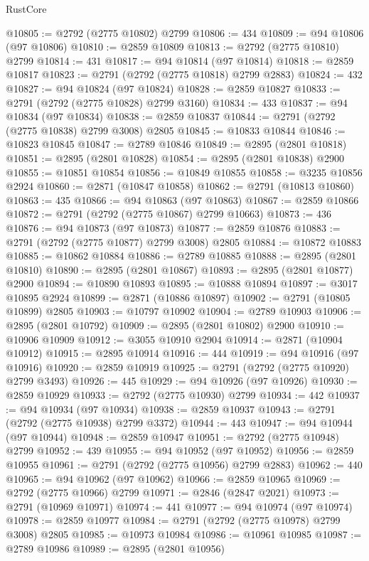 \begin{lexlean}{RustCore}
\begin{coremodule}
@10805 := @2792 (@2775 @10802) @2799
@10806 := 434
@10809 := @94 @10806 (@97 @10806)
@10810 := @2859 @10809
@10813 := @2792 (@2775 @10810) @2799
@10814 := 431
@10817 := @94 @10814 (@97 @10814)
@10818 := @2859 @10817
@10823 := @2791 (@2792 (@2775 @10818) @2799 @2883)
@10824 := 432
@10827 := @94 @10824 (@97 @10824)
@10828 := @2859 @10827
@10833 := @2791 (@2792 (@2775 @10828) @2799 @3160)
@10834 := 433
@10837 := @94 @10834 (@97 @10834)
@10838 := @2859 @10837
@10844 := @2791 (@2792 (@2775 @10838) @2799 @3008) @2805
@10845 := @10833 @10844
@10846 := @10823 @10845
@10847 := @2789 @10846
@10849 := @2895 (@2801 @10818)
@10851 := @2895 (@2801 @10828)
@10854 := @2895 (@2801 @10838) @2900
@10855 := @10851 @10854
@10856 := @10849 @10855
@10858 := @3235 @10856 @2924
@10860 := @2871 (@10847 @10858)
@10862 := @2791 (@10813 @10860)
@10863 := 435
@10866 := @94 @10863 (@97 @10863)
@10867 := @2859 @10866
@10872 := @2791 (@2792 (@2775 @10867) @2799 @10663)
@10873 := 436
@10876 := @94 @10873 (@97 @10873)
@10877 := @2859 @10876
@10883 := @2791 (@2792 (@2775 @10877) @2799 @3008) @2805
@10884 := @10872 @10883
@10885 := @10862 @10884
@10886 := @2789 @10885
@10888 := @2895 (@2801 @10810)
@10890 := @2895 (@2801 @10867)
@10893 := @2895 (@2801 @10877) @2900
@10894 := @10890 @10893
@10895 := @10888 @10894
@10897 := @3017 @10895 @2924
@10899 := @2871 (@10886 @10897)
@10902 := @2791 (@10805 @10899) @2805
@10903 := @10797 @10902
@10904 := @2789 @10903
@10906 := @2895 (@2801 @10792)
@10909 := @2895 (@2801 @10802) @2900
@10910 := @10906 @10909
@10912 := @3055 @10910 @2904
@10914 := @2871 (@10904 @10912)
@10915 := @2895 @10914
@10916 := 444
@10919 := @94 @10916 (@97 @10916)
@10920 := @2859 @10919
@10925 := @2791 (@2792 (@2775 @10920) @2799 @3493)
@10926 := 445
@10929 := @94 @10926 (@97 @10926)
@10930 := @2859 @10929
@10933 := @2792 (@2775 @10930) @2799
@10934 := 442
@10937 := @94 @10934 (@97 @10934)
@10938 := @2859 @10937
@10943 := @2791 (@2792 (@2775 @10938) @2799 @3372)
@10944 := 443
@10947 := @94 @10944 (@97 @10944)
@10948 := @2859 @10947
@10951 := @2792 (@2775 @10948) @2799
@10952 := 439
@10955 := @94 @10952 (@97 @10952)
@10956 := @2859 @10955
@10961 := @2791 (@2792 (@2775 @10956) @2799 @2883)
@10962 := 440
@10965 := @94 @10962 (@97 @10962)
@10966 := @2859 @10965
@10969 := @2792 (@2775 @10966) @2799
@10971 := @2846 (@2847 @2021)
@10973 := @2791 (@10969 @10971)
@10974 := 441
@10977 := @94 @10974 (@97 @10974)
@10978 := @2859 @10977
@10984 := @2791 (@2792 (@2775 @10978) @2799 @3008) @2805
@10985 := @10973 @10984
@10986 := @10961 @10985
@10987 := @2789 @10986
@10989 := @2895 (@2801 @10956)

\end{coremodule}
\end{lexlean}
